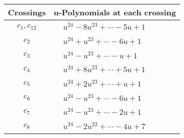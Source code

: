 \documentclass[1p]{elsarticle_modified}
\theoremstyle{definition}
\begin{document}
\begin{tabular}{m{50pt}|m{274pt}}
Crossings & \hspace{64pt}u-Polynomials at each crossing \\
\hline $$\begin{aligned}c_{1},c_{12}\end{aligned}$$&$\begin{aligned}
&u^{24}-8 u^{23}+\cdots-5 u+1
\end{aligned}$\\
\hline $$\begin{aligned}c_{2}\end{aligned}$$&$\begin{aligned}
&u^{24}+u^{23}+\cdots-6 u+1
\end{aligned}$\\
\hline $$\begin{aligned}c_{3}\end{aligned}$$&$\begin{aligned}
&u^{24}- u^{23}+\cdots- u+1
\end{aligned}$\\
\hline $$\begin{aligned}c_{4}\end{aligned}$$&$\begin{aligned}
&u^{24}+8 u^{23}+\cdots+5 u+1
\end{aligned}$\\
\hline $$\begin{aligned}c_{5}\end{aligned}$$&$\begin{aligned}
&u^{24}+2 u^{23}+\cdots+u+1
\end{aligned}$\\
\hline $$\begin{aligned}c_{6}\end{aligned}$$&$\begin{aligned}
&u^{24}- u^{23}+\cdots-6 u+1
\end{aligned}$\\
\hline $$\begin{aligned}c_{7}\end{aligned}$$&$\begin{aligned}
&u^{24}- u^{23}+\cdots-2 u+1
\end{aligned}$\\
\hline $$\begin{aligned}c_{8}\end{aligned}$$&$\begin{aligned}
&u^{24}-2 u^{22}+\cdots-4 u+7
\end{aligned}$\\

\end{tabular}
\end{document}
